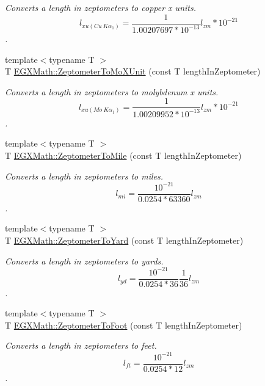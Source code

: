 \begin{DoxyCompactItemize}
\begin{DoxyCompactList}\small\item\em Converts a length in zeptometers to copper x units. \[ l_{xu(Cu\ K\alpha_1)}= \frac{1}{1.00207697*10^{-13}} l_{zm} * 10^{-21}\]. \end{DoxyCompactList}\item 
{\footnotesize template$<$typename T $>$ }\\T \mbox{\hyperlink{group___e_g_x_math-_conversions-_length_conversions-_s_i-_zeptometer-_non-_s_i_gaa621a874847d7e6aae8d04395c68a313}{E\+G\+X\+Math\+::\+Zeptometer\+To\+Mo\+X\+Unit}} (const T length\+In\+Zeptometer)
\begin{DoxyCompactList}\small\item\em Converts a length in zeptometers to molybdenum x units. \[ l_{xu(Mo\ K\alpha_1)}=\frac{1}{1.00209952*10^{-13}} l_{zm} * 10^{-21}\]. \end{DoxyCompactList}\item 
{\footnotesize template$<$typename T $>$ }\\T \mbox{\hyperlink{group___e_g_x_math-_conversions-_length_conversions-_s_i-_zeptometer-_imperial_ga2cd73cc7564758f2bf88f1a6e9269aff}{E\+G\+X\+Math\+::\+Zeptometer\+To\+Mile}} (const T length\+In\+Zeptometer)
\begin{DoxyCompactList}\small\item\em Converts a length in zeptometers to miles. \[ l_{mi}=\frac{10^{-21}}{0.0254 * 63360} l_{zm} \]. \end{DoxyCompactList}\item 
{\footnotesize template$<$typename T $>$ }\\T \mbox{\hyperlink{group___e_g_x_math-_conversions-_length_conversions-_s_i-_zeptometer-_imperial_ga91e05169db4f6ae477da7428ff5a42b8}{E\+G\+X\+Math\+::\+Zeptometer\+To\+Yard}} (const T length\+In\+Zeptometer)
\begin{DoxyCompactList}\small\item\em Converts a length in zeptometers to yards. \[ l_{yd}= \frac{10^{-21}}{0.0254 * 36} \frac{1}{36} l_{zm} \]. \end{DoxyCompactList}\item 
{\footnotesize template$<$typename T $>$ }\\T \mbox{\hyperlink{group___e_g_x_math-_conversions-_length_conversions-_s_i-_zeptometer-_imperial_ga2567dcbdc1b08aa9c9e99082ad9fe92b}{E\+G\+X\+Math\+::\+Zeptometer\+To\+Foot}} (const T length\+In\+Zeptometer)
\begin{DoxyCompactList}\small\item\em Converts a length in zeptometers to feet. \[ l_{ft}= \frac{10^{-21}}{0.0254 * 12} l_{zm} \]. \end{DoxyCompactList}\item 

\end{DoxyCompactItemize}
